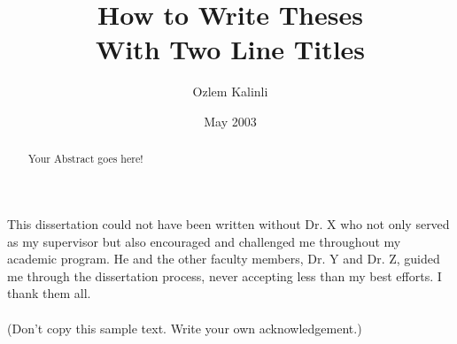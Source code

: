 \documentclass{iitthesis}
\begin{document}
\title{How to Write Theses\\
  With Two Line Titles}
\author{Ozlem Kalinli}
\date{May 2003}
\copyrightnoticetrue      %
\maketitle                %


\prelimpages         %


\begin{acknowledgement}     %
\par  This dissertation could not have been written without Dr. X
who not only served as my supervisor but also encouraged and
challenged me throughout my academic program. He and the other
faculty members, Dr. Y and Dr. Z, guided me through the
dissertation process, never accepting less than my best efforts. I
thank them all.\\ \\ (Don't copy this sample text. Write your own
acknowledgement.)
\end{acknowledgement}


\tableofcontents
\clearpage

\listoftables

\clearpage

\listoffigures

\clearpage


\listofsymbols


 \clearpage



\begin{abstract}           %
\par Your Abstract goes here!
\end{abstract}
\end{document}

